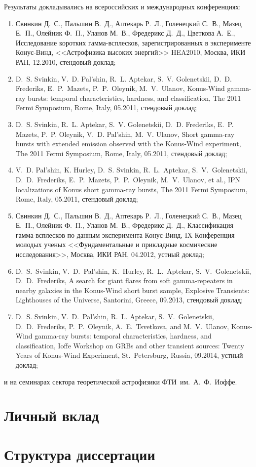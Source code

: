 Результаты докладывались на всероссийских и международных конференциях: 
\begin{enumerate}
\item Свинкин Д.~С., Пальшин В.~Д., Аптекарь Р.~Л., Голенецкий С.~В., Мазец Е.~П., 
    Олейник Ф.~П., Уланов М.~В., Фредерикс Д.~Д., Цветкова А.~Е., 
    Исследование коротких гамма-всплесков, зарегистрированных в эксперименте Конус-Винд,
    <<Астрофизика высоких энергий>> HEA2010, Москва, ИКИ РАН, 12.2010, стендовый доклад;
\item D.~S. Svinkin, V.~D. Pal'shin, R.~L. Aptekar, S.~V. Golenetskii, D.~D. Frederiks, 
    E.~P.~Mazets, P.~P.~Oleynik, M.~V.~Ulanov, 
    Konus-Wind gamma-ray bursts: temporal characteristics, hardness, and classification, 
    The 2011 Fermi Symposium, Rome, Italy, 05.2011, стендовый доклад;
\item D.~S. Svinkin, R.~L. Aptekar, S.~V. Golenetskii, D.~D. Frederiks, E.~P. Mazets,
    P.~P. Oleynik, V.~D. Pal'shin, M.~V. Ulanov, 
    Short gamma-ray bursts with extended emission observed with the Konus-Wind experiment,
    The 2011 Fermi Symposium, Rome, Italy, 05.2011, стендовый доклад;
\item V.~D. Pal'shin, K. Hurley, D.~S. Svinkin, R.~L.~Aptekar, S.~V.~Golenetskii, 
    D.~D.~Frederiks, E.~P.~Mazets, P.~P.~Oleynik, M.~V.~Ulanov, et al., 
    IPN localizations of Konus short gamma-ray bursts, 
    The 2011 Fermi Symposium, Rome, Italy, 05.2011, стендовый доклад;
\item Свинкин Д.~С., Пальшин В.~Д., Аптекарь Р.~Л., Голенецкий С.~В., Мазец Е.~П., 
    Олейник Ф.~П., Уланов М.~В., Фредерикс Д.~Д., 
    Классификация гамма-всплесков по данным эксперимента Конус-Винд,
    IX Конференция молодых ученых <<Фундаментальные и прикладные космические исследования>>, 
    Москва, ИКИ РАН, 04.2012, устный доклад;
\item D.~S.~Svinkin, V.~D.~Pal'shin, K.~Hurley, R.~L.~Aptekar, S.~V.~Golenetskii, D.~D.~Frederiks, 
    A search for giant flares from soft gamma-repeaters in nearby galaxies in the Konus-Wind short burst sample,
    Explosive Transients: Lighthouses of the Universe, Santorini, Greece, 09.2013, стендовый доклад;
\item D.~S. Svinkin, V.~D.~Pal'shin, R.~L. Aptekar, S.~V.~Golenetskii, D.~D.~Frederiks, 
    P.~P.~Oleynik, A.~E.~Tsvetkova, and M.~V.~Ulanov,
    Konus-Wind gamma-ray bursts: temporal characteristics, hardness, and classification,
    Ioffe Workshop on GRBs and other transient sources: Twenty Years of Konus-Wind Experiment, 
    St.~Petersburg, Russia, 09.2014, устный доклад;
\end{enumerate}
и на семинарах сектора теоретической астрофизики ФТИ~им.~А.~Ф.~Иоффе.

\section{Личный вклад}

\section{Структура диссертации}

\clearpage